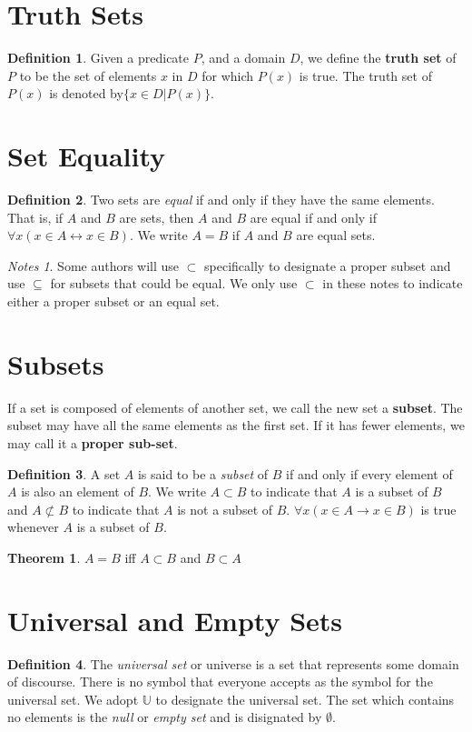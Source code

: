 \documentclass[11pt]{book} %
\theoremstyle {definition}
\newtheorem {definition}{Definition}[section]
\newtheorem {theorem}{Theorem}[section]
\theoremstyle {remark}
\newtheorem*{notes}{Notes}
\begin{document}
\section {Truth Sets}
\begin {definition}
Given a predicate $P$, and a domain $D$, we define the \textbf{truth set} of $P$ to be the set of elements $x$ in $D$ for which $P(x)$ is true. The truth set of $P(x)$ is denoted by$ \{ x \in D | P(x) \} $.
\end {definition}

  
\section {Set Equality}
\begin {definition}
Two sets are \textit{equal} if and only if they have the same elements. That is, if $A$ and $B$ are sets, then $A$ and $B$ are equal if and only if $\forall x(x \in A \leftrightarrow x \in B)$. We write $A=B$ if $A$ and $B$ are equal sets.
\end {definition}
\begin{notes}
Some authors will use $\subset$ specifically to designate a proper subset and use $\subseteq$ for subsets that could be equal. We only use $\subset$ in these notes to indicate either a proper subset or an equal set.
\end{notes}
  
\section{Subsets}
  If a set is composed of elements of another set, we call the new set a \textbf{subset}. The subset may have all the same elements as the first set. If it has fewer elements, we may call it a \textbf{proper sub-set}.
  
\begin {definition}
A set $A$ is said to be a \textit{subset} of $B$ if and only if every element of $A$ is also an element of $B$.  We write $A \subset B$ to indicate that $A$ is a subset of $B$ and $A \not\subset B$ to indicate that $A$ is not a subset of $B$. $\forall x(x \in A \rightarrow x \in B)$ is true whenever $A$ is a subset of $B$.
\end {definition} 

\begin {theorem}
$A=B$  iff $A \subset B$ and $B \subset A$
\end {theorem}

\section {Universal and Empty Sets}
\begin {definition}
The \textit{universal set} or universe is a set that represents some domain of discourse. There is no symbol that everyone accepts as the symbol for the universal set. We adopt $\mathbb{U}$ to designate the universal set.
The set which contains no elements is the \textit{null} or \textit{empty set} and is disignated by $\emptyset$. 
\end {definition}
\end{document}
